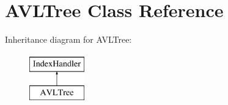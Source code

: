 \hypertarget{class_a_v_l_tree}{\section{A\+V\+L\+Tree Class Reference}
\label{class_a_v_l_tree}
}
Inheritance diagram for A\+V\+L\+Tree\+:\begin{figure}[H]
\begin{center}
\leavevmode
\includegraphics[height=2.000000cm]{class_a_v_l_tree}
\end{center}
\end{figure}
